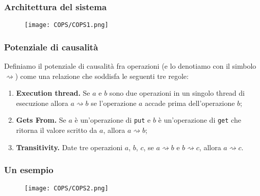 \begin{frame}
\frametitle{Architettura del sistema}
	\begin{figure}
		\centering
		\texttt{[image: COPS/COPS1.png]}
	\end{figure}
\end{frame}

\begin{frame}
\frametitle{Potenziale di causalità}
	\begin{definizione}
	Definiamo il \alert{potenziale di causalità} fra operazioni (e lo denotiamo con 
	il simbolo $\rightsquigarrow$) come una relazione che soddisfa le seguenti tre regole:
	\begin{enumerate}
		\item<1-> \textbf{Execution thread.}
				  Se $a$ e $b$ sono due operazioni in un singolo thread di esecuzione
				  allora $a \rightsquigarrow b$ se l'operazione $a$ accade prima dell'operazione $b$;
		\item<1-> \textbf{Gets From.}
				  Se $a$ è un'operazione di \texttt{put} e $b$ è un'operazione di
				  \texttt{get} che ritorna il valore scritto da $a$, allora $a \rightsquigarrow b$;
		\item<1-> \textbf{Transitivity.}
				  Date tre operazioni $a$, $b$, $c$, se $a \rightsquigarrow b$ e $b 
				  \rightsquigarrow c$, allora $a \rightsquigarrow c$.
	\end{enumerate}
	\end{definizione}
\end{frame}

\begin{frame}
\frametitle{Un esempio}
	\begin{figure}
		\centering
		\texttt{[image: COPS/COPS2.png]}
	\end{figure}
\end{frame}

